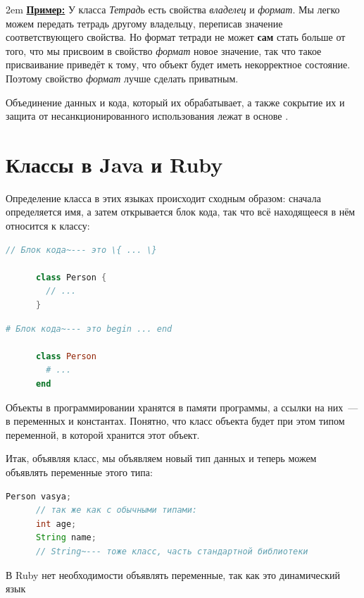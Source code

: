 \documentclass[a4paper, 14pt, titlepage]{extarticle}
\newcommand{\strong}[1]{\textbf{#1}}
\newcommand{\define}[1]{\uwave{#1}}
\newenvironment{indented}%
    { \begingroup %
        \noindent %
        \leftskip2em %
        \rightskip\leftskip }%
    { \par\endgroup }
\newenvironment{example}%
    { \begin{indented} %
        \color{dkgreen} %
        \small %
        \textbf{\underline{Пример:}} }%
    { \end{indented} }
\newenvironment{halfpage}%
    {\noindent\begin{minipage}[h]{0.49\linewidth}} %
    {\end{minipage}\hfill}
\begin{document}
  \begin{example}
    У класса \emph{Тетрадь} есть свойства \emph{владелец} и \emph{формат}. Мы легко можем передать
    тетрадь другому владельцу, переписав значение соответствующего свойства. Но формат тетради не
    может \strong{сам} стать больше от того, что мы присвоим в свойство \emph{формат} новое
    значение, так что такое присваивание приведёт к тому, что объект будет иметь некорректное
    состояние. Поэтому свойство \emph{формат} лучше сделать приватным.
  \end{example}

  Объединение данных и кода, который их обрабатывает, а также сокрытие их и защита от
  несанкционированного использования лежат в основе \define{принципа инкапсуляции}.

  \section{Классы в Java и Ruby}

  Определение класса в этих языках происходит сходным образом: сначала определяется имя, а затем
  открывается блок кода, так что всё находящееся в нём относится к классу:

  \begin{halfpage}
    \begin{lstlisting}[language=Java, title={Класс в Java}, gobble=6, texcl]
      // Блок кода~--- это \{ ... \}
      
      class Person {
        // ...
      }
    \end{lstlisting}
  \end{halfpage}
  \begin{halfpage}
    \begin{lstlisting}[language=Ruby, title={Класс в Ruby}, gobble=6, texcl]
      # Блок кода~--- это begin ... end
      
      class Person
        # ...
      end
    \end{lstlisting}
  \end{halfpage}

  Объекты в программировании хранятся в памяти программы, а ссылки на них~--- в переменных и
  константах. Понятно, что класс объекта будет при этом типом переменной, в которой хранится этот объект.

  Итак, объявляя класс, мы объявляем новый тип данных и теперь можем объявлять переменные этого типа:

  \begin{halfpage}
    \begin{lstlisting}[language=Java, title={Переменные в Java}, gobble=6, texcl]
      Person vasya;
      // так же как с обычными типами:
      int age;
      String name;
      // String~--- тоже класс, часть стандартной библиотеки
    \end{lstlisting}
  \end{halfpage}
  \begin{halfpage}
    \vskip 5mm
    В Ruby нет необходимости объявлять
    переменные, так как это динамический язык
  \end{halfpage}
\end{document}
